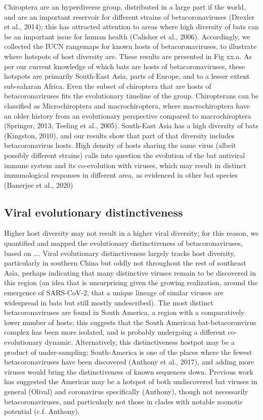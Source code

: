 \documentclass[11pt]{article}
\begin{document}
Chiroptera are an hyperdiverse group, distributed in a large part if the
world, and are an important reservoir for different strains of
betacoronaviruses (Drexler et al., 2014); this has attracted attention
to areas where high diversity of bats can be an important issue for
human health (Calisher et al., 2006). Accordingly, we collected the IUCN
rangemaps for known hosts of betacoronaviruses, to illustrate where
hotspots of host diversity are. These results are presented in Fig xx.a.
As per our current knowledge of which bats are hosts of
betacoronaviruses, these hotspots are primarily South-East Asia, parts
of Europe, and to a lesser extent sub-saharan Africa. Even the subset of
chiroptera that are hosts of betacoronaviruses fits the evolutionary
timeline of the group. Chiropterans can be classified as Microchiroptera
and macrochiroptera, where macrochiroptera have an older history from an
evolutionary perspective compared to macrochiroptera (Springer, 2013;
Teeling et al., 2005). South-East Asia has a high diversity of bats
(Kingston, 2010), and our results show that part of that diversity
includes betacoronavirus hosts. High density of hosts sharing the same
virus (albeit possibly different strains) calls into question the
evolution of the bat antiviral immune system and its co-evolution with
viruses, which may result in distinct immunological responses in
different area, as evidenced in other bat species (Banerjee et al.,
2020)

\hypertarget{viral-evolutionary-distinctiveness}{%
\subsection{Viral evolutionary
distinctiveness}\label{viral-evolutionary-distinctiveness}}

Higher host diversity may not result in a higher viral diversity; for
this reason, we quantified and mapped the evolutionary distinctiveness
of betacoronaviruses, based on \ldots. Viral evolutionary
distinctiveness largely tracks host diversity, particularly in southern
China but oddly not throughout the rest of southeast Asia, perhaps
indicating that many distinctive viruses remain to be discovered in this
region (an idea that is unsurprising given the growing realization,
around the emergence of SARS-CoV-2, that a unique lineage of similar
viruses are widespread in bats but still mostly undescribed). The most
distinct betacoronaviruses are found in South America, a region with a
comparatively lower number of hosts; this suggests that the South
American bat-betacoronvirus complex has been more isolated, and is
probably undergoing a different co-evolutionary dynamic. Alternatively,
this distinctiveness hostpot may be a product of under-sampling:
South-America is one of the places where the fewest betacoronaviruses
have been discovered (Anthony et al., 2017), and adding more viruses
would bring the distinctiveness of known sequences down. Previous work
has suggested the Americas may be a hotspot of both undiscovered bat
viruses in general (Olival) and coronavirus specifically (Anthony),
though not necessarily betacoronaviruses, and particularly not those in
clades with notable zoonotic potential (c.f. Anthony).
\end{document}
